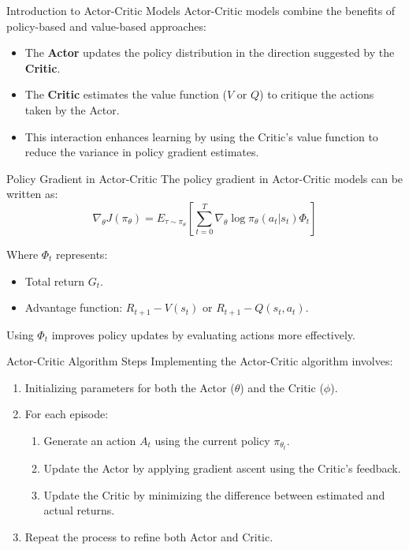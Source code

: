 \documentclass{beamer}
\begin{document}
\begin{frame}{Introduction to Actor-Critic Models}
Actor-Critic models combine the benefits of policy-based and value-based approaches:
\begin{itemize}
    \item The \textbf{Actor} updates the policy distribution in the direction suggested by the \textbf{Critic}.
    \item The \textbf{Critic} estimates the value function (\(V\) or \(Q\)) to critique the actions taken by the Actor.
    \item This interaction enhances learning by using the Critic’s value function to reduce the variance in policy gradient estimates.
\end{itemize}
\end{frame}
\begin{frame}{Policy Gradient in Actor-Critic}
The policy gradient in Actor-Critic models can be written as:
\[\nabla_{\theta} J(\pi_{\theta}) = E_{\tau \sim \pi_{\theta}}\left[\sum_{t=0}^{T} \nabla_{\theta} \log \pi_{\theta}(a_t |s_t) \Phi_t\right]\]

Where \(\Phi_t\) represents:
\begin{itemize}
    \item Total return \(G_t\).
    \item Advantage function: \(R_{t+1} - V(s_t)\) or \(R_{t+1} - Q(s_t, a_t)\).
\end{itemize}
Using \(\Phi_t\) improves policy updates by evaluating actions more effectively.
\end{frame}
\begin{frame}{Actor-Critic Algorithm Steps}
Implementing the Actor-Critic algorithm involves:
\begin{enumerate}
    \item Initializing parameters for both the Actor (\(\theta\)) and the Critic (\(\phi\)).
    \item For each episode:
        \begin{enumerate}
            \item Generate an action \(A_t\) using the current policy \(\pi_{\theta_t}\).
            \item Update the Actor by applying gradient ascent using the Critic's feedback.
            \item Update the Critic by minimizing the difference between estimated and actual returns.
        \end{enumerate}
    \item Repeat the process to refine both Actor and Critic.
\end{enumerate}
\end{frame}
\end{document}
